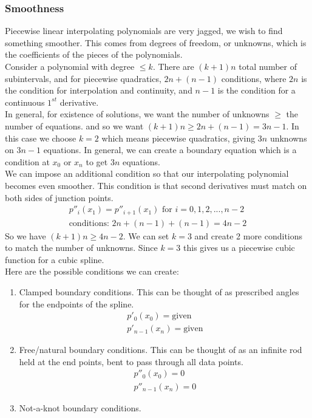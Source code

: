 \documentclass[12pt, letterpaper]{article}
\begin{document}
\subsubsection{Smoothness}
Piecewise linear interpolating polynomials are very jagged, we wish to find something smoother. 
This comes from degrees of freedom, or unknowns, which is the coefficients of the pieces of the polynomials. \\

\noindent Consider a polynomial with degree $\le k$. There are $(k+1)n$ total number of subintervals, 
and for piecewise quadratics, $2n+(n-1)$ conditions, where $2n$ is the condition for interpolation and continuity, 
and $n-1$ is the condition for a continuous $1^{st}$ derivative. \\

\noindent In general, for existence of solutions, we want the number of unknowns $\ge$ the number of equations.
and so we want $(k+1)n\ge 2n+(n-1) = 3n-1$. In this case we choose $k=2$ which means piecewise quadratics, giving $3n$ unknowns on $3n-1$ equations.
In general, we can create a boundary equation which is a condition at $x_0$ or $x_n$ to get $3n$ equations. \\

\noindent We can impose an additional condition so that our interpolating polynomial becomes even smoother. 
This condition is that second derivatives must match on both sides of junction points.
\begin{align*}
    p''_i(x_1) = p''_{i+1}(x_1) \text{ for } i=0,1,2,...,n-2 \\ 
    \text{conditions: } 2n + (n-1) +(n-1) = 4n-2
\end{align*}
So we have $(k+1)n \ge 4n-2$. We can set $k = 3$ and create 2 more conditions to match the number of unknowns.
Since $k=3$ this gives us a piecewise cubic function for a cubic spline. \\

\noindent Here are the possible conditions we can create:
\begin{enumerate}
    \item Clamped boundary conditions. This can be thought of as prescribed angles for the endpoints of the spline.
    \begin{align*}
        p'_0(x_0) = \text{given} \\
        p'_{n-1}(x_n) = \text{given}
    \end{align*}
    \item Free/natural boundary conditions. This can be thought of as an infinite rod held at the end points, bent to pass through all data points.
    \begin{align*}
        p''_0(x_0) = 0 \\
        p''_{n-1}(x_n) = 0
    \end{align*}
    \item Not-a-knot boundary conditions.
\end{enumerate}
\end{document}

